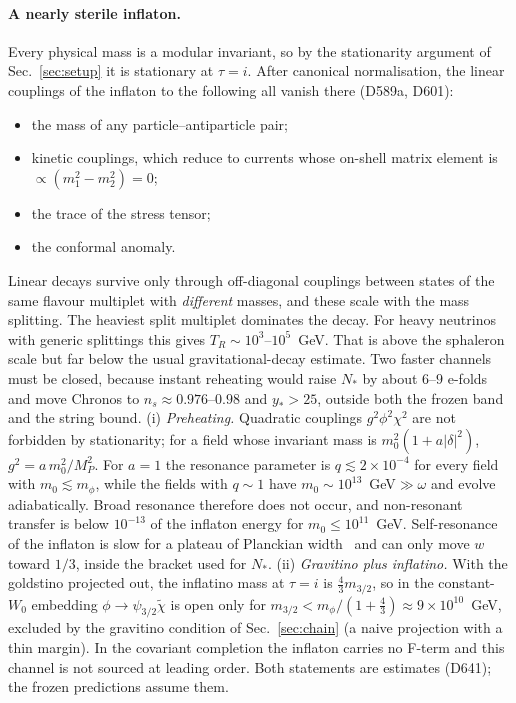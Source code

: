 \documentclass[aps,prd,twocolumn,superscriptaddress,nofootinbib,floatfix]{revtex4-2}
\begin{document}
\paragraph{A nearly sterile inflaton.} Every physical mass is a modular invariant, so by the stationarity argument of Sec.~\ref{sec:setup} it is stationary at $\tau = i$. After canonical normalisation, the linear couplings of the inflaton to the following all vanish there (D589a, D601):
\begin{itemize}
\item the mass of any particle--antiparticle pair;
\item kinetic couplings, which reduce to currents whose on-shell matrix element is $\propto(m_1^2 - m_2^2) = 0$;
\item the trace of the stress tensor;
\item the conformal anomaly.
\end{itemize}
Linear decays survive only through off-diagonal couplings between states of the same flavour multiplet with \emph{different} masses, and these scale with the mass splitting. The heaviest split multiplet dominates the decay. For heavy neutrinos with generic splittings this gives $T_R \sim 10^3$--$10^5$~GeV. That is above the sphaleron scale but far below the usual gravitational-decay estimate. Two faster channels must be closed, because instant reheating would raise $N_*$ by about $6$--$9$ e-folds and move Chronos to $n_s\approx0.976$--$0.98$ and $y_*>25$, outside both the frozen band and the string bound. (i) \emph{Preheating.} Quadratic couplings $g^2\phi^2\chi^2$ are not forbidden by stationarity; for a field whose invariant mass is $m_0^2(1+a|\delta|^2)$, $g^2=a\,m_0^2/M_P^2$. For $a=1$ the resonance parameter is $q\lesssim2\times10^{-4}$ for every field with $m_0\lesssim m_\phi$, while the fields with $q\sim1$ have $m_0\sim10^{13}$~GeV$\gg\omega$ and evolve adiabatically. Broad resonance therefore does not occur, and non-resonant transfer is below $10^{-13}$ of the inflaton energy for $m_0\le10^{11}$~GeV. Self-resonance of the inflaton is slow for a plateau of Planckian width~\cite{arXiv_1710_06851} and can only move $w$ toward $1/3$, inside the bracket used for $N_*$. (ii) \emph{Gravitino plus inflatino.} With the goldstino projected out, the inflatino mass at $\tau=i$ is $\tfrac43m_{3/2}$, so in the constant-$W_0$ embedding $\phi\to\psi_{3/2}\tilde\chi$ is open only for $m_{3/2}<m_\phi/(1+\tfrac43)\approx9\times10^{10}$~GeV, excluded by the gravitino condition of Sec.~\ref{sec:chain} (a naive projection with a thin margin). In the covariant completion the inflaton carries no F-term and this channel is not sourced at leading order. Both statements are estimates (D641); the frozen predictions assume them.
\end{document}
